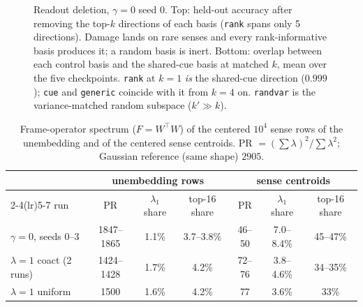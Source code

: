 \documentclass{article}
\begin{document}
\begin{figure}[h]
  \caption{Readout deletion, $\gamma{=}0$ seed 0. Top: held-out accuracy after removing the
    top-$k$ directions of each basis (\texttt{rank} spans only 5 directions). Damage lands on
    rare senses and every rank-informative basis produces it; a random basis is inert.
    Bottom: overlap between each control basis and the shared-cue basis at matched $k$, mean
    over the five checkpoints. \texttt{rank} at $k{=}1$ \emph{is} the shared-cue direction
    ($0.999$); \texttt{cue} and \texttt{generic} coincide with it from $k{=}4$ on.
  \texttt{randvar} is the variance-matched random subspace ($k'\gg k$).}
  \label{fig:abl}
\end{figure}
\begin{table}[h]
  \centering\footnotesize
  \caption{Frame-operator spectrum ($F{=}W^\top W$) of the centered $10^4$ sense rows of
    the unembedding and of the centered sense centroids. PR
  ${=}(\sum\lambda)^2/\sum\lambda^2$; Gaussian reference (same shape) $2905$.}
  \label{tab:frame}

  \renewcommand{\arraystretch}{1.1}
  \begin{tabular}{@{}lcccccc@{}}
    \toprule
    & \multicolumn{3}{c}{unembedding rows} & \multicolumn{3}{c}{sense centroids} \\
    \cmidrule(lr){2-4}\cmidrule(lr){5-7}
    run & PR & $\lambda_1$ share & top-16 share & PR & $\lambda_1$ share & top-16 share \\
    \midrule
    $\gamma{=}0$, seeds 0--3 & 1847--1865 & 1.1\% & 3.7--3.8\% & 46--50 & 7.0--8.4\% & 45--47\% \\
    $\lambda{=}1$ coact (2 runs) & 1424--1428 & 1.7\% & 4.2\% & 72--76 & 3.8--4.6\% & 34--35\% \\
    $\lambda{=}1$ uniform & 1500 & 1.6\% & 4.2\% & 77 & 3.6\% & 33\% \\
    \bottomrule
  \end{tabular}
\end{table}
\end{document}

